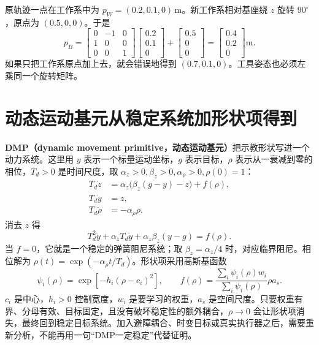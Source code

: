 \begin{examplebox}[把运镜轨迹绕基座旋转]
原轨迹一点在工作系中为 $p_W=(0.2,0.1,0)\,\mathrm m$。新工作系相对基座绕 $z$ 旋转 $90^\circ$，原点为 $(0.5,0,0)$。于是
\[
p_B=\begin{bmatrix}0&-1&0\\1&0&0\\0&0&1\end{bmatrix}
\begin{bmatrix}0.2\\0.1\\0\end{bmatrix}
+\begin{bmatrix}0.5\\0\\0\end{bmatrix}
=\begin{bmatrix}0.4\\0.2\\0\end{bmatrix}\mathrm m.
\]
如果只把工作系原点加上去，就会错误地得到 $(0.7,0.1,0)$。工具姿态也必须左乘同一个旋转矩阵。
\end{examplebox}

\section{动态运动基元从稳定系统加形状项得到}

\textbf{DMP（dynamic movement primitive，动态运动基元）}把示教形状写进一个动力系统。这里用 $y$ 表示一个标量运动坐标，$g$ 表示目标，$\rho$ 表示从一衰减到零的相位，$T_d>0$ 是时间尺度，取 $\alpha_z>0,\beta_z>0,\alpha_\rho>0,\rho(0)=1$：
\begin{align}
T_d\dot z&=\alpha_z\big(\beta_z(g-y)-z\big)+f(\rho),\\
T_d\dot y&=z,\\
T_d\dot\rho&=-\alpha_\rho\rho.
\end{align}
消去 $z$ 得
\begin{equation}
T_d^2\ddot y+\alpha_zT_d\dot y+\alpha_z\beta_z(y-g)=f(\rho).
\end{equation}
当 $f=0$，它就是一个稳定的弹簧阻尼系统；取 $\beta_z=\alpha_z/4$ 时，对应临界阻尼。相位解为 $\rho(t)=\exp(-\alpha_\rho t/T_d)$。形状项采用高斯基函数
\begin{equation}
\psi_i(\rho)=\exp[-h_i(\rho-c_i)^2],\qquad
f(\rho)=\frac{\sum_i\psi_i(\rho)w_i}{\sum_i\psi_i(\rho)}\rho a_s.
\end{equation}
$c_i$ 是中心，$h_i>0$ 控制宽度，$w_i$ 是要学习的权重，$a_s$ 是空间尺度。只要权重有界、分母有效、目标固定，且没有破坏稳定性的额外耦合，$\rho\to0$ 会让形状项消失，最终回到稳定目标系统。加入避障耦合、时变目标或真实执行器之后，需要重新分析，不能再用一句“DMP一定稳定”代替证明。

